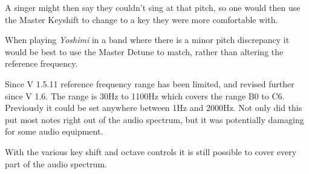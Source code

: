    A singer might then say they couldn't sing at that pitch, so one would then
   use the Master Keyshift to change to a key they were more comfortable with.

   When playing \textsl{Yoshimi} in a band where there is a minor pitch
   discrepancy it would be best to use the Master Detune to match, rather than
   altering the reference frequency.

   Since V 1.5.11 reference frequency range has been limited, and revised
   further since V 1.6. The range is 30Hz to 1100Hz which covers the range B0
   to C6. Previously it could be set anywhere between 1Hz and 2000Hz.
   Not only did this put most notes right out of the audio spectrum, but it was
   potentially damaging for some audio equipment.

   With the various key shift and octave controls it is still possible to cover
   every part of the audio spectrum.

